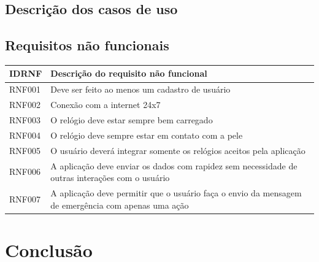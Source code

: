 \documentclass[
	12pt,				%
	openright,			%
	a4paper,			%
	oneside, 
	chapter=TITLE,		%
	english,			%
	brazil				%
	]{abntex2}
\begin{document}
\section{Descrição dos casos de uso}
%

%

%

%

%

%

%
\section{Requisitos não funcionais}
\begin{center}
\begin{tabular}{ |p{7cm}|p{7cm}| }
 \hline
 \textbf{IDRNF} & \textbf{Descrição do requisito não funcional} \\ [0.5ex] 
 \hline
 RNF001 & Deve ser feito ao menos um cadastro de usuário \\ 
 \hline
 RNF002 & Conexão com a internet 24x7 \\ 
 \hline
 RNF003 & O relógio deve estar sempre bem carregado \\ 
 \hline
 RNF004 & O relógio deve sempre estar em contato com a pele \\
 \hline
 RNF005 & O usuário deverá integrar somente os relógios aceitos pela aplicação \\
 \hline
 RNF006 & A aplicação deve enviar os dados com rapidez sem necessidade de outras interações
  com o usuário \\
  \hline
 RNF007 & A aplicação deve permitir que o usuário faça o envio da mensagem de emergência com apenas uma ação \\
 \hline
\end{tabular}
\end{center}

\chapter{Conclusão}

\postextual

\end{document}
